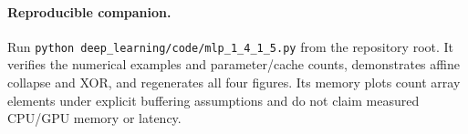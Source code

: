 \paragraph{Reproducible companion.}
Run \texttt{python deep\_learning/code/mlp\_1\_4\_1\_5.py} from the repository root. It verifies the numerical examples and parameter/cache counts, demonstrates affine collapse and XOR, and regenerates all four figures. Its memory plots count array elements under explicit buffering assumptions and do not claim measured CPU/GPU memory or latency.
